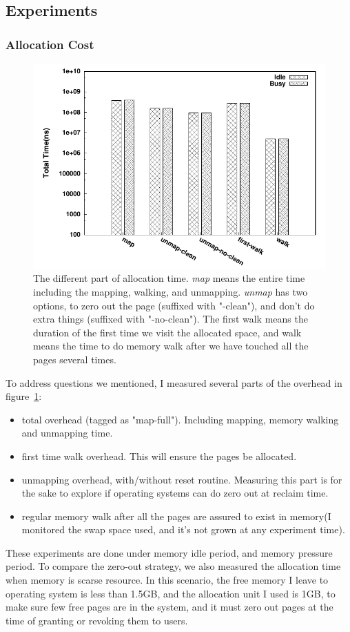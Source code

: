 \subsection{Experiments}
\subsubsection{Allocation Cost}
\begin{figure}[htpb]
\centering
\includegraphics[width=0.8\linewidth]{../figures/alloc}
\caption{The different part of allocation time. \emph{map} means the entire time
including the mapping, walking, and unmapping. \emph{unmap} has two options, to
zero out the page (suffixed with "-clean"), and don't do extra things (suffixed
with "-no-clean"). The first walk means the duration of the first time we visit
the allocated space, and walk means the time to do memory walk after we have
touched all the pages several times.}
\label{fig:alloc}
\end{figure}
To address questions we mentioned, I measured several parts of the overhead in 
figure~\ref{fig:alloc}:
\begin{itemize}
\item total overhead (tagged as "map-full"). Including mapping, memory walking
and unmapping time.
\item first time walk overhead. This will ensure the pages be allocated.
\item unmapping overhead, with/without reset routine. Measuring this part is
for the sake to explore if operating systems can do zero out at reclaim time.
\item regular memory walk after all the pages are assured to exist in memory(I
monitored the swap space used, and it's not grown at any experiment time).
\end{itemize}
These experiments are done under memory idle period, and memory pressure
period. To compare the zero-out strategy, we also measured the allocation
time when memory is scarse resource. In this scenario, the free memory I leave
to operating system is less than 1.5GB, and the allocation unit I used is
1GB, to make sure few free pages are in the system, and it must zero out pages
at the time of granting or revoking them to users.

